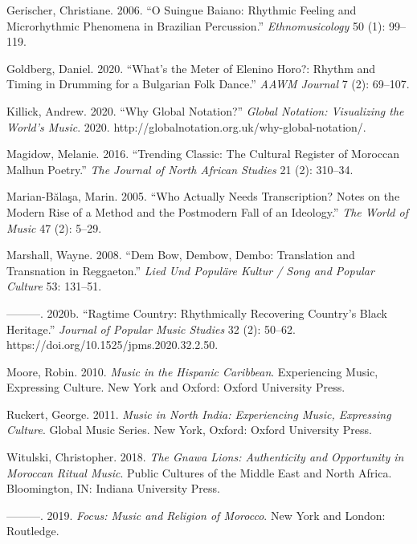 \documentclass[twoside]{article}
\begin{document}
Gerischer, Christiane. 2006. ``O Suingue Baiano: Rhythmic Feeling and
Microrhythmic Phenomena in Brazilian Percussion.''
\emph{Ethnomusicology} 50 (1): 99--119.

Goldberg, Daniel. 2020. ``What's the Meter of Elenino Horo?: Rhythm and
Timing in Drumming for a Bulgarian Folk Dance.'' \emph{AAWM Journal} 7
(2): 69--107.

Killick, Andrew. 2020. ``Why Global Notation?'' \emph{Global Notation:
Visualizing the World's Music}. 2020.
http://globalnotation.org.uk/why-global-notation/.

Magidow, Melanie. 2016. ``Trending Classic: The Cultural Register of
Moroccan Malhun Poetry.'' \emph{The Journal of North African Studies} 21
(2): 310--34.

Marian-Bălaşa, Marin. 2005. ``Who Actually Needs Transcription? Notes on
the Modern Rise of a Method and the Postmodern Fall of an Ideology.''
\emph{The World of Music} 47 (2): 5--29.

Marshall, Wayne. 2008. ``Dem Bow, Dembow, Dembo: Translation and
Transnation in Reggaeton.'' \emph{Lied Und Populäre Kultur / Song and
Popular Culture} 53: 131--51.

---------. 2020b. ``Ragtime Country: Rhythmically Recovering Country's
Black Heritage.'' \emph{Journal of Popular Music Studies} 32 (2):
50--62. https://doi.org/10.1525/jpms.2020.32.2.50.

Moore, Robin. 2010. \emph{Music in the Hispanic Caribbean}. Experiencing
Music, Expressing Culture. New York and Oxford: Oxford University Press.

Ruckert, George. 2011. \emph{Music in North India: Experiencing Music,
Expressing Culture}. Global Music Series. New York, Oxford: Oxford
University Press.

Witulski, Christopher. 2018. \emph{The Gnawa Lions: Authenticity and
Opportunity in Moroccan Ritual Music}. Public Cultures of the Middle
East and North Africa. Bloomington, IN: Indiana University Press.

---------. 2019. \emph{Focus: Music and Religion of Morocco}. New York
and London: Routledge.
\end{document}

